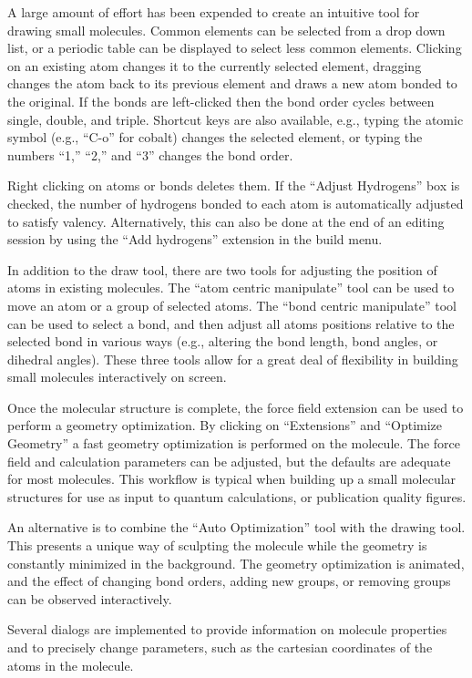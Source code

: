\documentclass[10pt]{bmc_article}
\newenvironment{bmcformat}{\begin{raggedright}
\baselineskip20pt\sloppy\setboolean{publ}{false}}{\end{raggedright}
\baselineskip20pt\sloppy}
\begin{document}
\begin{bmcformat}
A large amount of effort has been expended to create an intuitive tool for
drawing small molecules. Common elements can be selected from a drop down list,
or a periodic table can be displayed to select less common elements. Clicking on
an existing atom changes it to the currently selected element,
dragging changes the atom back to its previous element and draws
a new atom bonded to the original. If the bonds are left-clicked then the bond
order cycles between single, double, and triple. Shortcut keys are
also available, e.g., typing the
atomic symbol (e.g., ``C-o'' for cobalt) changes the selected element,
or typing the numbers ``1,'' ``2,'' and ``3'' changes the bond order.

Right clicking on atoms or bonds deletes them. If the ``Adjust Hydrogens'' box
is checked, the number of hydrogens bonded to each atom is automatically
adjusted to satisfy valency. Alternatively, this can also be done at the end of
an editing session by using the ``Add hydrogens'' extension in the build menu.

In addition to the draw tool, there are two tools for adjusting the position of
atoms in existing molecules. The ``atom centric manipulate'' tool can be used to
move an atom or a group of selected atoms. The ``bond centric manipulate'' tool
can
be used to select a bond, and then adjust all atoms positions relative to the
selected bond in various ways (e.g., altering the bond length, bond
angles, or dihedral angles). These three tools allow for a great deal of
flexibility in building small molecules interactively on screen.

Once the molecular structure is complete, the force field extension can be used to
perform a geometry optimization. By clicking on ``Extensions'' and ``Optimize
Geometry'' a fast geometry optimization is performed on the molecule. The
force field and calculation parameters can be adjusted, but the defaults are
adequate for most molecules. This workflow is typical when building up a small
molecular structures for use as input to quantum calculations, or publication
quality figures.

An alternative is to combine the ``Auto Optimization'' tool with the drawing
tool. This presents a unique way of sculpting the molecule while the geometry is
constantly minimized in the background. The geometry optimization is animated,
and the effect of changing bond orders, adding new groups, or removing groups can
be observed interactively.

Several dialogs are implemented to provide information on molecule properties
and to precisely change parameters, such as the cartesian coordinates of the atoms
in the molecule.


\end{bmcformat}
\end{document}
